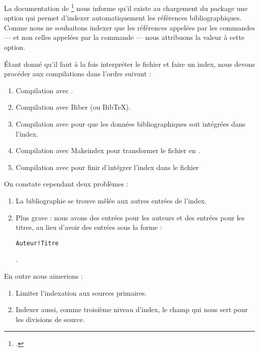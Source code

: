 La documentation de \footcite{biblatex_options} nous informe qu'il existe  au chargement du package une option  qui permet d'indexer automatiquement les références bibliographiques. Comme nous ne souhaitons indexer que les références appelées par les commandes   ---  et non celles appelées par la commande  --- nous attribuons la valeur  à cette option. 

\begin{latexcode}
\usepackage[indexing=cite]{biblatex}
\end{latexcode}

Étant donné qu'il faut à la fois interpréter le fichier  et faire un index, nous devons procéder aux compilations dans l'ordre suivant :

\begin{enumerate}
\item Compilation avec \XeLaTeX.
\item Compilation avec Biber (ou BibTeX).
\item Compilation avec \XeLaTeX pour que les données bibliographiques soit intégrées dans l'index.
\item Compilation avec Makeindex pour transformer le fichier  en .
\item Compilation avec \XeLaTeX pour finir d'intégrer l'index dans le fichier 
\end{enumerate}

On constate cependant deux problèmes : 
\begin{enumerate}
\item La bibliographie se trouve mêlée aux autres entrées de l'index.
\item Plus grave : nous avons des entrées pour les auteurs et des entrées pour les titres, au lieu d'avoir des entrées sous la forme : 

\begin{english}\verb|Auteur!Titre|\end{english}.
\end{enumerate}

En outre nous aimerions :
\begin{enumerate}
\item Limiter l'indexation aux sources primaires.
\item Indexer aussi, comme troisième niveau d'index, le champ  qui nous sert pour les divisions de source. 
\end{enumerate}

